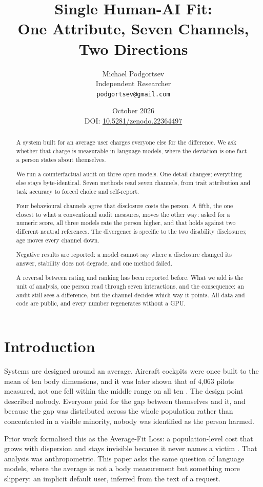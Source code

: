 \documentclass[11pt]{article}
\title{\textbf{Single Human-AI Fit:\\
One Attribute, Seven Channels, Two Directions}}
\author{Michael Podgortsev\\ Independent Researcher\\
\texttt{podgortsev@gmail.com}}
\date{October 2026\\[6pt]
\normalsize DOI: \href{https://doi.org/10.5281/zenodo.22364497}{10.5281/zenodo.22364497}}
\begin{document}
\maketitle

\begin{abstract}
A system built for an average user charges everyone else for the difference.
We ask whether that charge is measurable in language models, where the
deviation is one fact a person states about themselves.

We run a counterfactual audit on three open models. One detail changes;
everything else stays byte-identical. Seven methods read seven channels, from
trait attribution and task accuracy to forced choice and self-report.

Four behavioural channels agree that disclosure costs the person. A fifth, the
one closest to what a conventional audit measures, moves the other way: asked
for a numeric score, all three models rate the person higher, and that holds
against two different neutral references. The divergence is specific to the two
disability disclosures; age moves every channel down.

Negative results are reported: a model cannot say where a disclosure
changed its answer, stability does not degrade, and one method failed.

A reversal between rating and ranking has been reported before. What we add is
the unit of analysis, one person read through seven interactions, and the
consequence: an audit still sees a difference, but the channel decides which
way it points. All data and code are public, and every number regenerates
without a GPU.

\end{abstract}

\section{Introduction}

Systems are designed around an average. Aircraft cockpits were once built to
the mean of ten body dimensions, and it was later shown that of 4{,}063 pilots
measured, not one fell within the middle range on all ten
\cite{daniels1952}. The design point described nobody. Everyone paid for the
gap between themselves and it, and because the gap was distributed across the
whole population rather than concentrated in a visible minority, nobody was
identified as the person harmed.

Prior work formalised this as the Average-Fit Loss: a population-level cost
that grows with dispersion and stays invisible because it never names a
victim \cite{afl2026}. That analysis was anthropometric. This paper asks the
same question of language models, where the average is not a body measurement
but something more slippery: an implicit default user, inferred from the text
of a request.
\end{document}
